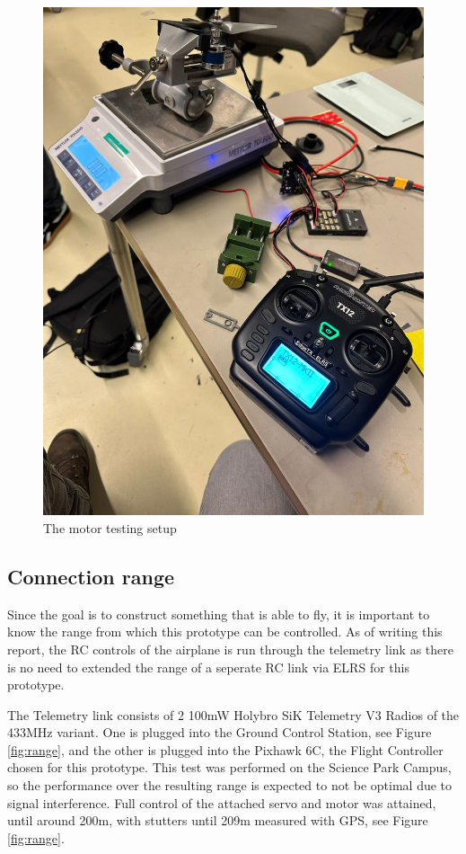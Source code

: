 \begin{figure}[h]
     \centering
     \includegraphics[width=0.5\linewidth]{images/Motor_test.jpg}
     \caption{The motor testing setup}
     \label{fig:Motor testing setup}
 \end{figure}

\subsection{Connection range}
Since the goal is to construct something that is able to fly, it is important to know the range from which this prototype can be controlled. As of writing this report, the RC controls of the airplane is run through the telemetry link as there is no need to extended the range of a seperate RC link via ELRS \cite{ELRS} for this prototype. 

The Telemetry link consists of 2 100mW Holybro SiK Telemetry V3 Radios  of the 433MHz variant. One is plugged into the Ground Control Station, see Figure \ref{fig:range}, and the other is plugged into the Pixhawk 6C, the Flight Controller chosen for this prototype. This test was performed on the Science Park Campus, so the performance over the resulting range is expected to not be optimal due to signal interference. Full control of the attached servo and motor was attained, until around 200m, with stutters until 209m measured with GPS, see Figure \ref{fig:range}.

